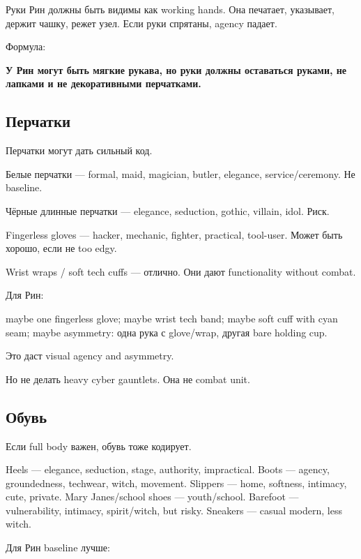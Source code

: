 Руки Рин должны быть видимы как working hands. Она печатает, указывает,
держит чашку, режет узел. Если руки спрятаны, agency падает.

Формула:

\textbf{У Рин могут быть мягкие рукава, но руки должны оставаться
руками, не лапками и не декоративными перчатками.}

\subsection*{Перчатки}

Перчатки могут дать сильный код.

Белые перчатки --- formal, maid, magician, butler, elegance,
service/\hspace{0pt}ceremony. Не baseline.

Чёрные длинные перчатки --- elegance, seduction, gothic, villain, idol.
Риск.

Fingerless gloves --- hacker, mechanic, fighter, practical, tool-user.
Может быть хорошо, если не too edgy.

Wrist wraps /\hspace{0pt} soft tech cuffs --- отлично. Они дают functionality
without combat.

Для Рин:

maybe one fingerless glove; maybe wrist tech band; maybe soft cuff with
cyan seam; maybe asymmetry: одна рука с glove/\hspace{0pt}wrap, другая bare holding
cup.

Это даст visual agency and asymmetry.

Но не делать heavy cyber gauntlets. Она не combat unit.

\subsection*{Обувь}

Если full body важен, обувь тоже кодирует.

Heels --- elegance, seduction, stage, authority, impractical. Boots ---
agency, groundedness, techwear, witch, movement. Slippers --- home,
softness, intimacy, cute, private. Mary Janes/\hspace{0pt}school shoes ---
youth/\hspace{0pt}school. Barefoot --- vulnerability, intimacy, spirit/\hspace{0pt}witch, but
risky. Sneakers --- casual modern, less witch.

Для Рин baseline лучше:

